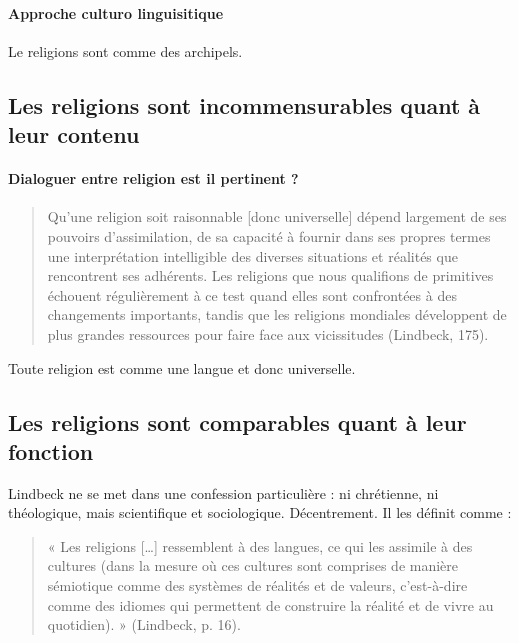   \paragraph{Approche culturo linguisitique}
 

  Le religions sont comme des archipels.
 
 \subsection{Les religions sont incommensurables quant à leur contenu}



 
 \paragraph{Dialoguer entre religion est il pertinent ? }
 
  \begin{quote}
     Qu’une religion soit raisonnable [donc universelle] dépend largement de ses pouvoirs d’assimilation, de sa capacité à fournir dans ses propres termes une interprétation intelligible des diverses situations et réalités que rencontrent ses adhérents. Les religions que nous qualifions de primitives échouent régulièrement à ce test quand elles sont confrontées à des changements importants, tandis que les religions mondiales développent de plus grandes ressources pour faire face aux vicissitudes (Lindbeck, 175). 
 \end{quote}
 
 Toute religion est comme une langue et donc universelle.
 
  \subsection{Les religions sont comparables quant à leur fonction}
  
  Lindbeck ne se met dans une confession particulière : ni chrétienne, ni théologique, mais scientifique et sociologique. Décentrement. 
  Il les définit comme : 
  
   \begin{quote}
     « Les religions […] ressemblent à des langues, ce qui les assimile à des cultures (dans la mesure où ces cultures sont comprises de manière sémiotique comme des systèmes de réalités et de valeurs, c’est-à-dire comme des idiomes qui permettent de construire la réalité et de vivre au quotidien). »  (Lindbeck, p. 16). 
 \end{quote}
  

